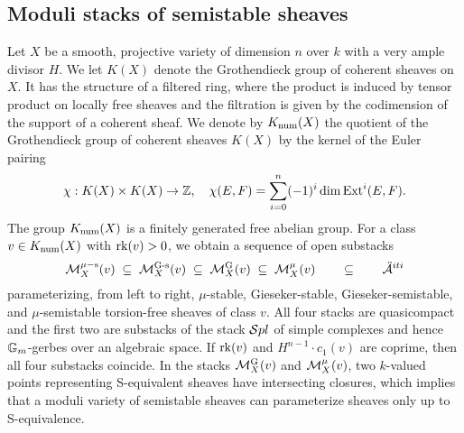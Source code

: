 \subsection{Moduli stacks of semistable sheaves}
Let $X$ be a smooth, projective variety of dimension $n$ over $k$ with a very ample divisor $H$. We let $K(X)$ denote the Grothendieck group of coherent sheaves on $X$. It has the structure of a filtered ring, where the product is induced by tensor product on locally free sheaves and the filtration is given by the codimension of the support of a coherent sheaf. We denote by $K_{\mathrm{num}}(X)$ the quotient of the Grothendieck group of coherent sheaves $K(X)$ by the kernel of the Euler pairing
\[ \chi: K(X) \times K(X) \to \mathbb{Z}, \quad \chi(E, F) = \sum_{i=0}^n (-1)^i \dim \mathrm{Ext}^i(E, F). \]
The group $K_{\mathrm{num}}(X)$ is a finitely generated free abelian group. For a class $v \in K_{\mathrm{num}}(X)$ with $\operatorname{\mathrm{rk}}(v) > 0$, we obtain a sequence of open substacks
\[ \mathcal{M}^{\mu-\text{s}}_X(v) \;\subseteq\; \mathcal{M}^{\text{G-s}}_X(v) \;\subseteq\; \mathcal{M}^{\text{G}}_X(v) \;\subseteq\; \mathcal{M}^{\mu}_X(v) \qquad \subseteq \qquad \ddot{\mathcal{A}}^{iti} \]
parameterizing, from left to right, $\mu$-stable, Gieseker-stable, Gieseker-semistable, and $\mu$-se\-mi\-stable torsion-free sheaves of class $v$. All four stacks are quasicompact and the first two are substacks of the stack $\mathcal{S} pl$ of simple complexes and hence $\mathbb{G}_m$-gerbes over an algebraic space. If $\operatorname{\mathrm{rk}}(v)$ and $H^{n-1}\cdot c_1(v)$ are coprime, then all four substacks coincide. In the stacks $\mathcal{M}^{\text{G}}_X(v)$ and $\mathcal{M}^{\mu}_X(v)$, two $k$-valued points representing S-equivalent sheaves have intersecting closures, which implies that a moduli variety of semistable sheaves can parameterize sheaves only up to S-equivalence.


